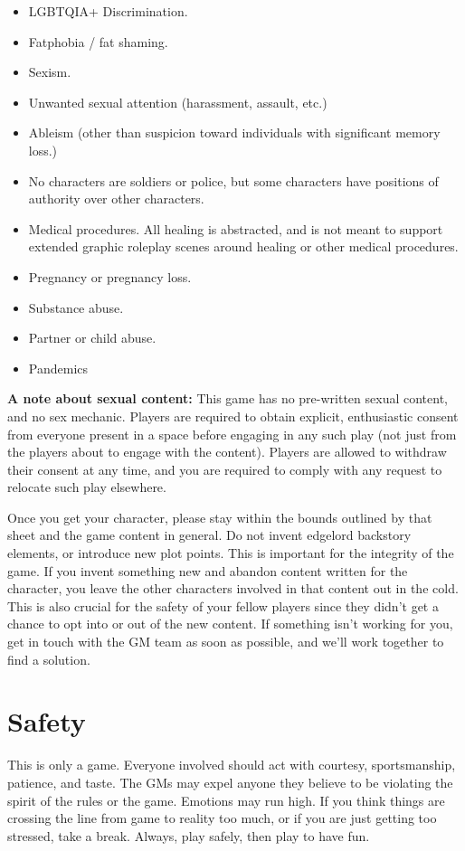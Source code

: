 \documentclass[sheet]{GL2020}
\begin{document}
\begin{multicols}{2}
\begin{itemize}
  	\item LGBTQIA+ Discrimination.
	\item Fatphobia / fat shaming.
	\item Sexism.
\item Unwanted sexual attention (harassment, assault, etc.)
	\item Ableism (other than suspicion toward individuals with significant memory loss.)
	\item No characters are soldiers or police, but some characters have positions of authority over other characters.
	\item Medical procedures. All healing is abstracted, and is not meant to support extended graphic roleplay scenes around healing or other medical procedures.
	\item Pregnancy or pregnancy loss.
	\item Substance abuse.
	\item Partner or child abuse.
	\item Pandemics
\end{itemize}
\end{multicols}

\textbf{A note about sexual content:} This game has no pre-written sexual content, and no sex mechanic. Players are required to obtain explicit, enthusiastic consent from everyone present in a space before engaging in any such play (not just from the players about to engage with the content). Players are allowed to withdraw their consent at any time, and you are required to comply with any request to relocate such play elsewhere.

Once you get your character, please stay within the bounds outlined by that sheet and the game content in general. Do not invent edgelord backstory elements, or introduce new plot points. This is important for the integrity of the game. If you invent something new and abandon content written for the character, you leave the other characters involved in that content out in the cold. This is also crucial for the safety of your fellow players since they didn’t get a chance to opt into or out of the new content. If something isn’t working for you, get in touch with the GM team as soon as possible, and we’ll work together to find a solution.

\section{Safety}
This is only a game.  Everyone involved should act with courtesy, sportsmanship, patience, and taste.  The GMs may expel anyone they believe to be violating the spirit of the rules or the game.  Emotions may run high. If you think things are crossing the line from game to reality too much, or if you are just getting too stressed, take a break. Always, play safely, then play to have fun. 
\end{document}
